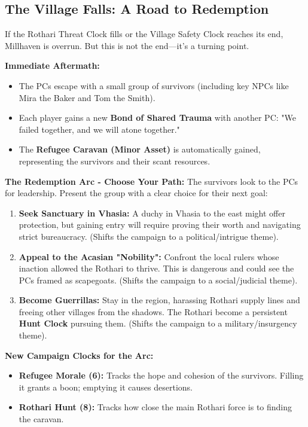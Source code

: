 \documentclass[11pt]{article}
\begin{document}
\subsection{The Village Falls: A Road to Redemption}

If the Rothari Threat Clock fills or the Village Safety Clock reaches its end, Millhaven is overrun. But this is not the end—it's a turning point.

\textbf{Immediate Aftermath:}
\begin{itemize}
\item The PCs escape with a small group of survivors (including key NPCs like Mira the Baker and Tom the Smith).
\item Each player gains a new \textbf{Bond of Shared Trauma} with another PC: "We failed together, and we will atone together."
\item The \textbf{Refugee Caravan (Minor Asset)} is automatically gained, representing the survivors and their scant resources.
\end{itemize}

\textbf{The Redemption Arc - Choose Your Path:}
The survivors look to the PCs for leadership. Present the group with a clear choice for their next goal:

\begin{enumerate}
\item \textbf{Seek Sanctuary in Vhasia:} A duchy in Vhasia to the east might offer protection, but gaining entry will require proving their worth and navigating strict bureaucracy. (Shifts the campaign to a political/intrigue theme).
\item \textbf{Appeal to the Acasian "Nobility":} Confront the local rulers whose inaction allowed the Rothari to thrive. This is dangerous and could see the PCs framed as scapegoats. (Shifts the campaign to a social/judicial theme).
\item \textbf{Become Guerrillas:} Stay in the region, harassing Rothari supply lines and freeing other villages from the shadows. The Rothari become a persistent \textbf{Hunt Clock} pursuing them. (Shifts the campaign to a military/insurgency theme).
\end{enumerate}

\textbf{New Campaign Clocks for the Arc:}
\begin{itemize}
\item \textbf{Refugee Morale (6):} Tracks the hope and cohesion of the survivors. Filling it grants a boon; emptying it causes desertions.
\item \textbf{Rothari Hunt (8):} Tracks how close the main Rothari force is to finding the caravan.
\end{itemize}
\end{document}
